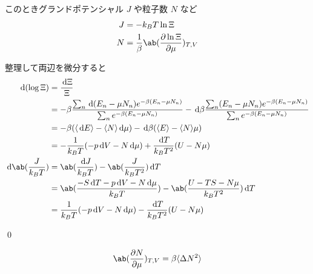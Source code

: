 \documentclass[uplatex,diffipdfmx,a4paper,11pt]{jlreq}
\makeatletter
\numberwithin{equation}{section}
\theoremstyle{definition}
\renewenvironment{proof}[1][\proofname]{\par
  \normalfont
  \topsep6\p@\@plus6\p@ \trivlist
  \item[\hskip\labelsep{\bfseries #1}\@addpunct{\bfseries}]\ignorespaces\quad\par
}{%
  \qed\endtrivlist\@endpefalse
}
\renewcommand\proofname{証明}
\makeatother
\begin{document}
\begin{theorem}
  このときグランドポテンシャル $J$ や粒子数 $N$ など
  \begin{align}
    J & = -k_BT\ln\Xi                                   \\
    N & = \frac{1}{\beta}\ab(\diffp{\ln\Xi}{\mu})_{T,V}
  \end{align}
\end{theorem}
\begin{proof}
  整理して両辺を微分すると
  \begin{align}
    \dl{(\log\Xi)}           & = \frac{\dl{\Xi}}{\Xi}                                                                                                                                                                                         \\
                             & = -\beta\frac{\sum_{n}\dl{(E_n - \mu N_n)}e^{-\beta(E_n - \mu N_n)}}{\sum_{n}e^{-\beta(E_n - \mu N_n)}} - \dl{\beta}\frac{\sum_{n}(E_n - \mu N_n)e^{-\beta(E_n - \mu N_n)}}{\sum_{n}e^{-\beta(E_n - \mu N_n)}} \\
                             & = -\beta(\langle\dl{E}\rangle - \langle N\rangle\dl{\mu}) - \dl{\beta}(\langle E\rangle - \langle N\rangle\mu)                                                                                                 \\
                             & = -\frac{1}{k_BT}(-p\dl{V} - N\dl{\mu}) + \frac{\dl{T}}{k_BT^2}(U - N\mu)                                                                                                                                      \\
    \dl{\ab(\frac{J}{k_BT})} & = \ab(\frac{\dl{J}}{k_BT}) - \ab(\frac{J}{k_BT^2})\dl{T}                                                                                                                                                       \\
                             & = \ab(\frac{-S\dl{T} - p\dl{V} - N\dl{\mu}}{k_BT}) - \ab(\frac{U - TS - N\mu}{k_BT^2})\dl{T}                                                                                                                   \\
                             & = \frac{1}{k_BT}(-p\dl{V} - N\dl{\mu}) - \frac{\dl{T}}{k_BT^2}(U - N\mu)
  \end{align}

\end{proof}

\begin{theorem}[粒子数の揺らぎ]
  \begin{align}
    \ab(\diffp{N}{\mu})_{T,V} = \beta\langle\Delta N^2\rangle
  \end{align}
\end{theorem}
\end{document}
